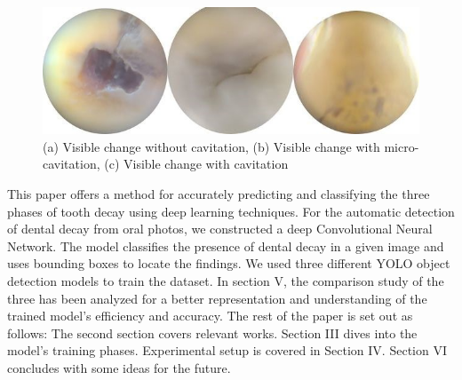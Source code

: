 \vspace{5pt}
\begin{figure}[H]
    \centering
    \includegraphics[scale=0.5]{10_Chapter_1/1.jpg}
    \caption{(a) Visible change without cavitation, (b) Visible change with micro-cavitation, (c) Visible change with cavitation}
    \label{Types of class}
\end{figure}
This paper offers a method for accurately predicting and classifying the three phases of tooth decay using deep learning techniques. For the automatic detection of dental decay from oral photos, we constructed a deep Convolutional Neural Network. The model classifies the presence of dental decay in a given image and uses bounding boxes to locate the findings. 
We used three different YOLO object detection models to train the dataset. In section V, the comparison study of the three has been analyzed for a better representation and understanding of the trained model's efficiency and accuracy. The rest of the paper is set out as follows: The second section covers relevant works. Section III dives into the model's training phases. Experimental setup is covered in Section IV. Section VI concludes with some ideas for the future.

